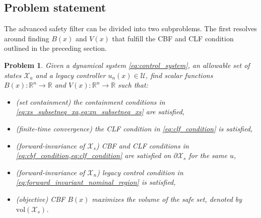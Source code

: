 \documentclass[lettersize,journal]{IEEEtran}
\newcommand{\R}{\mathbb{R}}
\newtheorem{problem}{Problem}
\begin{document}
\subsection{Problem statement} \label{sec:problem_statement}

The advanced safety filter can be divided into two subproblems.
The first resolves around finding $B(x)$ and $V(x)$ that fulfill the CBF and CLF condition outlined in the preceding section.
\begin{problem} \label{prob:finding_cbfs_and_clf}
   Given a dynamical system \cref{eq:control_system}, an allowable set of states $\mathcal X_a$ and a legacy controller $u_n(x) \in \mathcal U$, find scalar functions $B(x): \R^n \to \R$ and $V(x): \R^n \to \R$ such that: \begin{itemize}
      \item (set containment) the containment conditions in \cref{eq:xs_subsetneq_xa,eq:xn_subsetneq_xs} are satisfied,
      \item (finite-time convergence) the CLF condition in \cref{eq:clf_condition} is satisfied,
      \item (forward-invariance of $\mathcal X_s$) CBF and CLF conditions in \cref{eq:cbf_condition,eq:clf_condition} are satisfied on $\partial \mathcal X_s$ for the same $u$,
      \item (forward-invariance of $\mathcal X_n$) legacy control condition in \cref{eq:forward_invariant_nominal_region} is satisfied,
      \item (objective) CBF $B(x)$ maximizes the volume of the safe set, denoted by $\text{vol}(\mathcal X_s)$.
   \end{itemize}
\end{problem}
\end{document}
